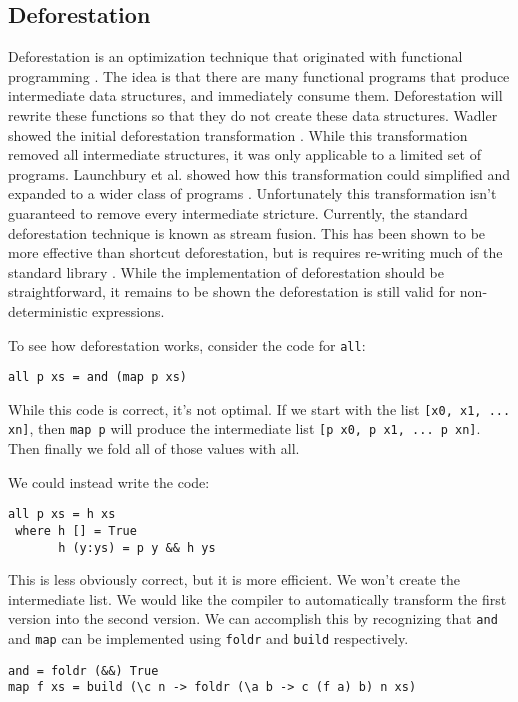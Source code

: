 \subsection{Deforestation}
Deforestation is an optimization technique that originated with functional programming \cite{deforestation_wadler}.
The idea is that there are many functional programs that produce intermediate data structures, and immediately consume them.
Deforestation will rewrite these functions so that they do not create these data structures.
Wadler showed the initial deforestation transformation \cite{deforestation_wadler}.
While this transformation removed all intermediate structures, it was only applicable to a limited set of programs.
Launchbury et al. showed how this transformation could simplified and expanded to a wider class of programs \cite{shortcut_deforestation}.
Unfortunately this transformation isn't guaranteed to remove every intermediate stricture.
Currently, the standard deforestation technique is known as stream fusion.
This has been shown to be more effective than shortcut deforestation, 
but is requires re-writing much of the standard library \cite{stream}.
While the implementation of deforestation should be straightforward,
it remains to be shown the deforestation is still valid for non-deterministic expressions.

To see how deforestation works, consider the code for \texttt{all}:
\begin{verbatim}
all p xs = and (map p xs)
\end{verbatim}
While this code is correct, it's not optimal.
If we start with the list \texttt{[x0, x1, ... xn]}, then \texttt{map p} will produce the intermediate list
\texttt{[p x0, p x1, ... p xn]}.
Then finally we fold all of those values with all.

We could instead write the code:
\begin{verbatim}
all p xs = h xs
 where h [] = True
       h (y:ys) = p y && h ys
\end{verbatim}
This is less obviously correct, but it is more efficient.  We won't create the intermediate list.
We would like the compiler to automatically transform the first version into the second version.
We can accomplish this by recognizing that \texttt{and} and \texttt{map} can be implemented using \texttt{foldr} and \texttt{build}
respectively.

\begin{verbatim}
and = foldr (&&) True
map f xs = build (\c n -> foldr (\a b -> c (f a) b) n xs)
\end{verbatim}

